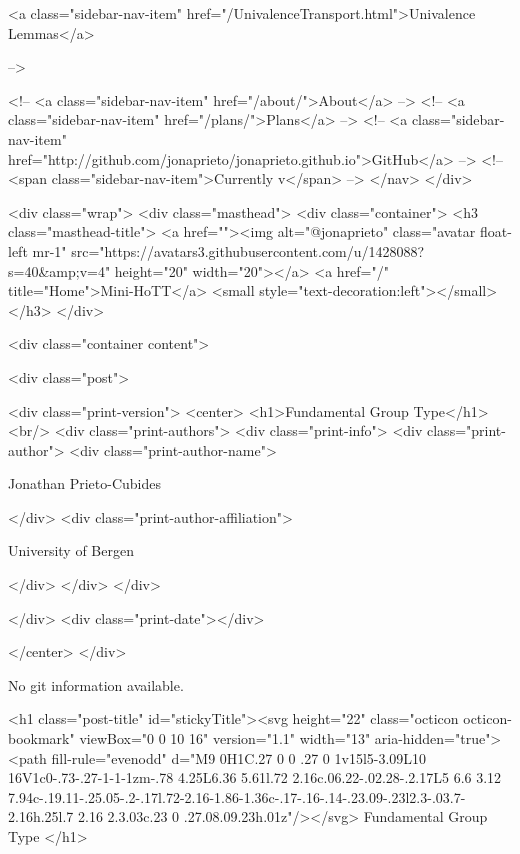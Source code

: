       
    
      
        
          <a class="sidebar-nav-item" href="/UnivalenceTransport.html">Univalence Lemmas</a>
        
      
     -->

    <!-- <a class="sidebar-nav-item" href="/about/">About</a> -->
    <!-- <a class="sidebar-nav-item" href="/plans/">Plans</a> -->
    <!-- <a class="sidebar-nav-item" href="http://github.com/jonaprieto/jonaprieto.github.io">GitHub</a> -->
    <!-- <span class="sidebar-nav-item">Currently v</span> -->
  </nav>
</div>

    <div class="wrap">
      <div class="masthead">
        <div class="container">
          <h3 class="masthead-title">
            <a href=""><img alt="@jonaprieto" class="avatar float-left mr-1" src="https://avatars3.githubusercontent.com/u/1428088?s=40&amp;v=4" height="20" width="20"></a>
            <a href="/" title="Home">Mini-HoTT</a>
            <small style="text-decoration:left"></small>
          </h3>
        </div>
      
      <div class="container content">
        







<div class="post">

  <div class="print-version">
    <center>
      <h1>Fundamental Group Type</h1><br/>
        <div class="print-authors">
          <div class="print-info">
            <div class="print-author">
              <div class="print-author-name">
                
                  Jonathan Prieto-Cubides
                
              </div>
              <div class="print-author-affiliation">
                
                  University of Bergen
                
                </div>
            </div>
          </div>
          
          
        </div>
        <div class="print-date"></div>
        
        
    </center>
  </div>

  
  No git information available.
  
  <h1 class="post-title" id="stickyTitle"><svg height="22" class="octicon octicon-bookmark" viewBox="0 0 10 16" version="1.1" width="13" aria-hidden="true"><path fill-rule="evenodd" d="M9 0H1C.27 0 0 .27 0 1v15l5-3.09L10 16V1c0-.73-.27-1-1-1zm-.78 4.25L6.36 5.61l.72 2.16c.06.22-.02.28-.2.17L5 6.6 3.12 7.94c-.19.11-.25.05-.2-.17l.72-2.16-1.86-1.36c-.17-.16-.14-.23.09-.23l2.3-.03.7-2.16h.25l.7 2.16 2.3.03c.23 0 .27.08.09.23h.01z"/></svg> Fundamental Group Type
  </h1>


